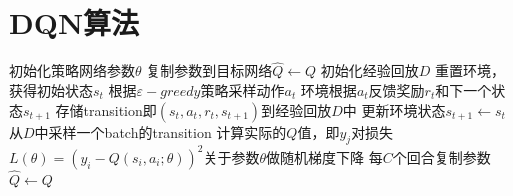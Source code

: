 \documentclass[11pt]{ctexart}
\begin{document}
\section{DQN算法}
\begin{algorithm}[H] %
    \renewcommand{\thealgorithm}{} %
	\caption{} 
    \renewcommand{\algorithmicrequire}{\textbf{输入:}}  
    \renewcommand{\algorithmicensure}{\textbf{输出:}} 
	\begin{algorithmic}[1]
		\STATE 初始化策略网络参数$\theta$ %
		\STATE 复制参数到目标网络$\hat{Q} \leftarrow Q$
		\STATE 初始化经验回放$D$
			\STATE 重置环境，获得初始状态$s_t$
				\STATE 根据$\varepsilon-greedy$策略采样动作$a_t$
				\STATE 环境根据$a_t$反馈奖励$r_t$和下一个状态$s_{t+1}$
				\STATE 存储transition即$(s_t,a_t,r_t,s_{t+1})$到经验回放$D$中
				\STATE 更新环境状态$s_{t+1} \leftarrow s_t$
				\STATE 从$D$中采样一个batch的transition
				\STATE 计算实际的$Q$值，即$y_{j}$\footnotemark[2]
				\STATE 对损失 $L(\theta)=\left(y_{i}-Q\left(s_{i}, a_{i} ; \theta\right)\right)^{2}$关于参数$\theta$做随机梯度下降\footnotemark[3]
			\ENDFOR
			\STATE 每$C$个回合复制参数$\hat{Q}\leftarrow Q$\footnotemark[4]
		\ENDFOR
	\end{algorithmic}
\end{algorithm}
\clearpage
\end{document}
